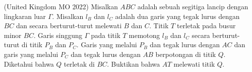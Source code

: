 \documentclass[11pt]{scrartcl}
\begin{document}
\begin{problem}
    (United Kingdom MO 2022) Misalkan $ABC$ adalah sebuah segitiga lancip dengan lingkaran luar $\Gamma$. Misalkan $l_B$ dan $l_C$ adalah dua garis yang tegak lurus dengan $BC$ dan secara berturut-turut melewati $B$ dan $C$. Titik $T$ terletak pada busur minor $BC$. Garis singgung $\Gamma$ pada titik $T$ memotong $l_B$ dan $l_C$ secara berturut-turut di titik $P_B$ dan $P_C$. Garis yang melalui $P_B$ dan tegak lurus dengan $AC$ dan garis yang melalui $P_C$ dan tegak lurus dengan $AB$ berpotongan di titik $Q$. Diketahui bahwa $Q$ terletak di $BC$. Buktikan bahwa $AT$ melewati titik $Q$.
\end{problem}
\end{document}
